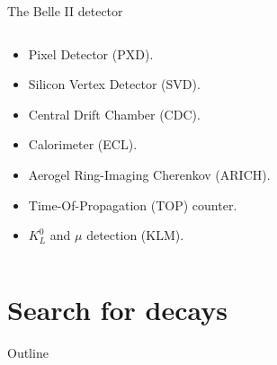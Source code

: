 \begin{frame}{{The Belle II detector}}
\begin{columns}
\begin{column}{0.45\linewidth} 
\begin{itemize} \small
\item Pixel Detector (PXD).
\vspace{0.25cm}
\item Silicon Vertex Detector (SVD).
\vspace{0.25cm}
\item Central Drift Chamber (CDC).
\vspace{0.25cm}
\item Calorimeter (ECL).
\vspace{0.25cm}
\item Aerogel Ring-Imaging Cherenkov (ARICH).
\vspace{0.25cm}
\item Time-Of-Propagation (TOP) counter.
\vspace{0.25cm}
\item $K_L^0$ and $\mu$ detection (KLM).
\end{itemize}
\end{column}
\begin{column}{0.55\linewidth}
\centering
{}
\end{column}
\end{columns}
\end{frame}
\section{Search for \BKnn decays}
\begin{frame}[noframenumbering]{Outline}
 \tableofcontents[currentsection]
\end{frame}
